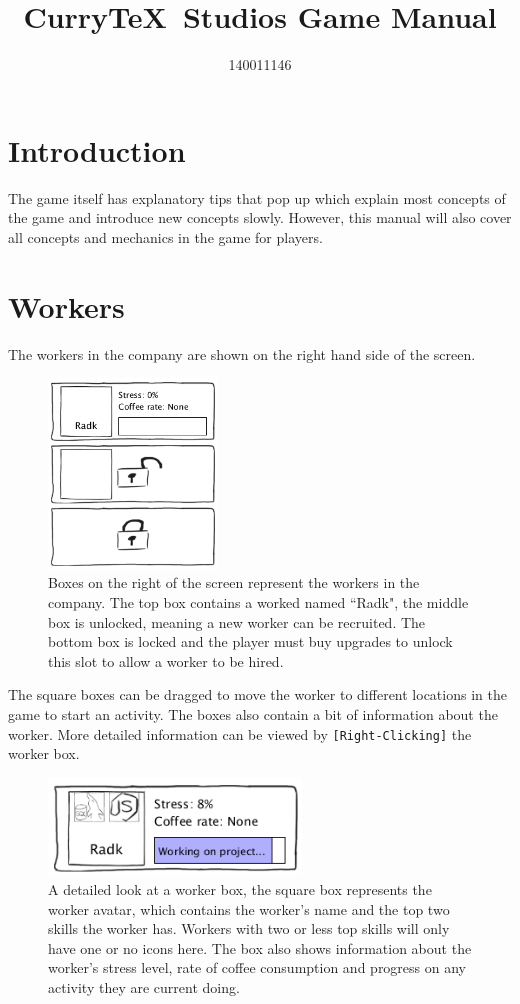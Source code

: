 \documentclass[11pt]{article}
\author{140011146}
\title{Curry\TeX\ Studios Game Manual}
\begin{document}
\maketitle

\section{Introduction}
The game itself has explanatory tips that pop up which explain most concepts of the game and introduce new concepts slowly. However, this manual will also cover all concepts and mechanics in the game for players.

\section{Workers}
The workers in the company are shown on the right hand side of the screen. 
\begin{figure}[H]
\centering
\includegraphics[width=0.4\textwidth, keepaspectratio]{imgs/all-workers.png}
\caption{Boxes on the right of the screen represent the workers in the company. The top box contains a worked named ``Radk", the middle box is unlocked, meaning a new worker can be recruited. The bottom box is locked and the player must buy upgrades to unlock this slot to allow a worker to be hired.}
\end{figure}
\noindent
The square boxes can be dragged to move the worker to different locations in the game to start an activity. The boxes also contain a bit of information about the worker. More detailed information can be viewed by \texttt{[Right-Clicking]} the worker box. 
\begin{figure}[H]
\centering
\includegraphics[width=0.6\textwidth, keepaspectratio]{imgs/worker.png}
\caption{A detailed look at a worker box, the square box represents the worker avatar, which contains the worker's name and the top two skills the worker has. Workers with two or less top skills will only have one or no icons here. The box also shows information about the worker's stress level, rate of coffee consumption and progress on any activity they are current doing.}
\end{figure}
\end{document}
